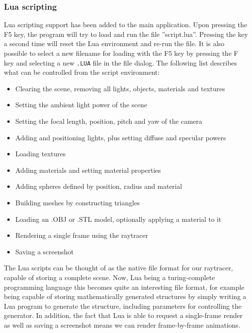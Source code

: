 \documentclass[a4paper,11pt]{article}
\begin{document}
\subsubsection{Lua scripting}
Lua scripting support has been added to the main application. Upon pressing the
F5 key, the program will try to load and run the file ''script.lua''. Pressing
the key a second time will reset the Lua environment and re-run the file. It is also possible
to select a new filename for loading with the F5 key by pressing the F key and selecting a new
\texttt{.LUA} file in the file dialog. The following
list describes what can be controlled from the script environment:

\begin{itemize}
\item Clearing the scene, removing all lights, objects, materials and textures
\vspace{-.3cm}
\item Setting the ambient light power of the scene
\vspace{-.3cm}
\item Setting the focal length, position, pitch and yaw of the camera
\vspace{-.3cm}
\item Adding and positioning lights, plus setting diffuse and specular powers
\vspace{-.3cm}
\item Loading textures
\vspace{-.3cm}
\item Adding materials and setting material properties
\vspace{-.3cm}
\item Adding spheres defined by position, radius and material
\vspace{-.3cm}
\item Building meshes by constructing triangles
\vspace{-.3cm}
\item Loading an .OBJ or .STL model, optionally applying a material to it
\vspace{-.3cm}
\item Rendering a single frame using the raytracer
\vspace{-.3cm}
\item Saving a screenshot
\end{itemize}

The Lua scripts can be thought of as the native file format for our raytracer,
capable of storing a complete scene. Now, Lua being a turing-complete programming language
this becomes quite an interesting file format, for example being capable of storing
mathematically generated structures by simply writing a Lua program to generate the structure,
including parameters for controlling the generator.
In addition, the fact that Lua is able to request a single-frame render as well as saving
a screenshot means we can render frame-by-frame animations.
\end{document}
